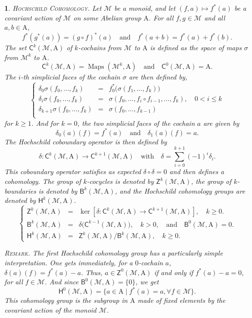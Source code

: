 \documentclass[12pt,reqno]{amsart}
\theoremstyle{article}
\newtheorem{article}{}
\def\artlabel[#1]{\textsc{#1}.}
\def \A{\mathrm A}
\newcommand{\cM}{\mathcal{M}}
\newcommand{\sC}{\mathsf{C}}
\newcommand{\sZ}{\mathsf{Z}}
\newcommand{\sB}{\mathsf{B}}
\newcommand{\sH}{\mathsf{H}}
\DeclareMathOperator{\Maps}{Maps}
\begin{document}
  \begin{article}\artlabel[Hochschild Cohomology]
    \label{Hochschild-Cohomology}
    Let $\cM$ be a monoid,
    and let $(f,a) \mapsto f^*(a)$ be a covariant action of $\cM$ on some Abelian group $\A$.
    For all $f,g \in \cM$ and all $a,b \in \A$,
    $$
    f^*(g^*(a)) = (g \circ f)^*(a)
    \quad \text{and} \quad
    f^*(a+b) = f^*(a) + f^*(b).
    $$
    The set $\sC^k(\cM,\A)$ of $k$-cochains from $\cM$ to $\A$ is defined as the space of maps $\sigma$ from $\cM^k$ to $\A$.
    $$
    \sC^k(\cM,\A) = \Maps(\cM^k,\A)
    \quad \text{and} \quad
    \sC^0(\cM,\A) = \A.
    $$
    The $i$-th simplicial faces of the cochain $\sigma$ are then defined by,
    $$
    \left \{ \begin{array}{lcl}
      \delta_0\sigma (f_0,\ldots,f_k) & = & f_0^*\big(\sigma(f_1,\ldots,f_k)\big) \\
      \delta_{i}\sigma (f_0,\ldots,f_k) & = &\sigma(f_0,\ldots,f_{i}\circ f_{i-1},\ldots,f_k),
      \quad  0<i\leq k  \\
      \delta_{k+1}\sigma (f_0,\ldots,f_k) & = & \sigma(f_0,\ldots,f_{k-1}) \\
    \end{array}\right.
    $$
    for $k \geq 1$. And for $k=0$,
    the two simplicial faces of the cochain $a$ are given by
    $$
    \delta_0(a)(f) = f^*(a)
    \quad \text{and} \quad
    \delta_1(a)(f) = a.
    $$
    The Hochschild coboundary operator is then defined by
    $$
    \delta \colon \sC^k(\cM,\A) \to \sC^{k+1}(\cM,\A)
    \quad \text{with} \quad
    \delta = \sum_{i=0}^{k+1} (-1)^i\delta_i.
    $$
    This coboundary operator satisfies as expected $\delta \circ \delta = 0$ and then defines a cohomology.
    The group of $k$-cocycles is denoted by $\sZ^k(\cM,\A)$,
    the group of $k$-boundaries is denoted by $\sB^k(\cM,\A)$,
    and the \emph{Hochschild cohomology groups} are denoted by $\sH^k(\cM,\A)$.
    $$
    \left \{ \begin{array}{lcl}
      \sZ^k(\cM,\A) & = & \ker[\delta \colon \sC^k(\cM,\A) \to \sC^{k+1}(\cM,\A)], \quad k\geq 0. \\[.3ex]
      \sB^k(\cM,\A) & = & \delta \big(\sC^{k-1}(\cM,\A)\big), \quad k>0, \quad \text{and} \quad \sB^0(\cM,\A) =0. \\[.3ex]
      \sH^k(\cM,\A) & = & \sZ^k(\cM,\A)/\sB^k(\cM,\A), \quad k \geq 0.
    \end{array}\right.
    $$
    
    \textsc{Remark.} The first Hochschild cohomology group has a particularly simple interpretation.
    One gets immediately,
    for a $0$-cochain $a$,
    $\delta(a)(f) = f^*(a) - a$.
    Thus,
    $a \in \sZ^0(\cM,\A)$ if and only if $f^*(a) - a = 0$,
    for all $f \in \cM$.
    And since $\sB^0(\cM,\A) = \{0\}$,
    we get
    $$
    \sH^0(\cM,\A) = \{ a \in \A \mid f^*(a) = a, \forall f \in \cM \}.
    $$
    This cohomology group is the subgroup in $\A$ made of fixed elements by the covariant action of the monoid $\cM$.
  \end{article}
  
\end{document}
